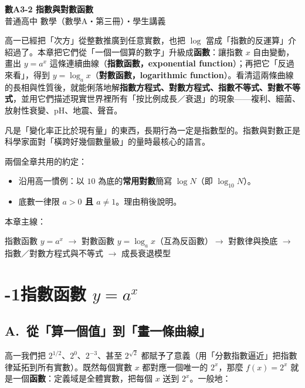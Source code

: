 \documentclass[11pt]{article}
\begin{document}
\begin{center}
{\sffamily\Huge\bfseries 數A3-2 指數與對數函數}\\[3pt]
{\sffamily\large 普通高中 數學（數學A・第三冊）・學生講義}
\end{center}
\vspace{0.6em}

高一已經把「次方」從整數推廣到任意實數，也把 $\log$ 當成「指數的反運算」介紹過了。本章把它們從「一個一個算的數字」升級成\textbf{函數}：讓指數 $x$ 自由變動，畫出 $y=a^{x}$ 這條連續曲線（\textbf{指數函數，exponential function}）；再把它「反過來看」，得到 $y=\log_{a}x$（\textbf{對數函數，logarithmic function}）。看清這兩條曲線的長相與性質後，就能俐落地解\textbf{指數方程式、對數方程式、指數不等式、對數不等式}，並用它們描述現實世界裡所有「按比例成長／衰退」的現象——複利、細菌、放射性衰變、pH、地震、聲音。

凡是「變化率正比於現有量」的東西，長期行為一定是指數型的。指數與對數正是科學家面對「橫跨好幾個數量級」的量時最核心的語言。

\medskip
兩個全章共用的約定：

\begin{itemize}\setlength{\itemsep}{2pt}
\item 沿用高一慣例：以 $10$ 為底的\textbf{常用對數}簡寫 $\log N$（即 $\log_{10}N$）。
\item 底數一律限 \textbf{$a>0$ 且 $a\ne 1$}。理由稍後說明。
\end{itemize}

\medskip
本章主線：

\begin{center}
指數函數 $y=a^x$ $\rightarrow$ 對數函數 $y=\log_a x$（互為反函數）$\rightarrow$ 對數律與換底 $\rightarrow$ 指數／對數方程式與不等式 $\rightarrow$ 成長衰退模型
\end{center}

\section*{-1\quad 指數函數 $y=a^{x}$}

\subsection*{\sffamily A.\ 從「算一個值」到「畫一條曲線」}

高一我們把 $2^{1/2}$、$2^{0}$、$2^{-3}$、甚至 $2^{\sqrt2}$ 都賦予了意義（用「分數指數逼近」把指數律延拓到所有實數）。既然每個實數 $x$ 都對應一個唯一的 $2^x$，那麼 $f(x)=2^{x}$ 就是一個\textbf{函數}：定義域是全體實數，把每個 $x$ 送到 $2^x$。一般地：
\end{document}
